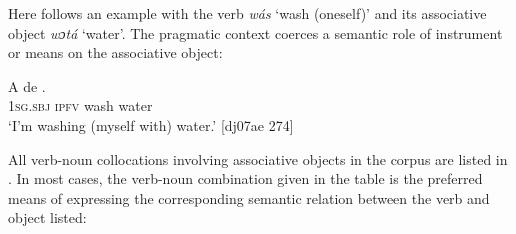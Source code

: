 Here follows an example with the verb \textit{wás} ‘wash (oneself)’ and its associative object \textit{wɔtá} ‘water’. The pragmatic context coerces a semantic role of instrument\index{} or means on the associative object: 



\ea%
    \label{ex:key:1172}
    \gll A    de      .\\
\textsc{1sg.sbj}  \textsc{ipfv}  wash  water\\

\glt ‘I’m washing (myself with) water.’ [dj07ae 274]
\z

All verb-noun collocations involving associative objects in the corpus are listed in . In most cases, the verb-noun combination given in the table is the preferred means of expressing the corresponding semantic relation between the verb and object listed:


